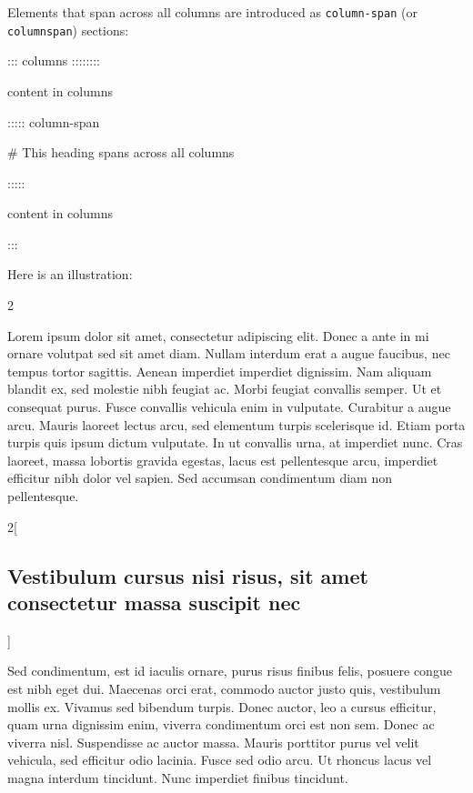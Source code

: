 \documentclass[
]{article}
\newenvironment{Shaded}{}{}
\newcommand{\NormalTok}[1]{#1}
\begin{document}
Elements that span across all columns are introduced as
\texttt{column-span} (or \texttt{columnspan}) sections:

\begin{Shaded}
\begin{Highlighting}[]
\NormalTok{::: columns ::::::::}

\NormalTok{content in columns}

\NormalTok{::::: column{-}span}

\NormalTok{\# This heading spans across all columns}

\NormalTok{:::::}

\NormalTok{content in columns}

\NormalTok{:::}
\end{Highlighting}
\end{Shaded}

Here is an illustration:

{\raggedcolumns\setlength{\columnseprule}{ 1pt}
\renewcommand{\columnseprulecolor}{\color{black}}
\begin{multicols}{2}

Lorem ipsum dolor sit amet, consectetur adipiscing elit. Donec a ante in
mi ornare volutpat sed sit amet diam. Nullam interdum erat a augue
faucibus, nec tempus tortor sagittis. Aenean imperdiet imperdiet
dignissim. Nam aliquam blandit ex, sed molestie nibh feugiat ac. Morbi
feugiat convallis semper. Ut et consequat purus. Fusce convallis
vehicula enim in vulputate. Curabitur a augue arcu. Mauris laoreet
lectus arcu, sed elementum turpis scelerisque id. Etiam porta turpis
quis ipsum dictum vulputate. In ut convallis urna, at imperdiet nunc.
Cras laoreet, massa lobortis gravida egestas, lacus est pellentesque
arcu, imperdiet efficitur nibh dolor vel sapien. Sed accumsan
condimentum diam non pellentesque.

\end{multicols}
\begin{multicols}{2}[\hypertarget{vestibulum-cursus-nisi-risus-sit-amet-consectetur-massa-suscipit-nec}{%
\subsection{Vestibulum cursus nisi risus, sit amet consectetur massa
suscipit
nec}\label{vestibulum-cursus-nisi-risus-sit-amet-consectetur-massa-suscipit-nec}}]

Sed condimentum, est id iaculis ornare, purus risus finibus felis,
posuere congue est nibh eget dui. Maecenas orci erat, commodo auctor
justo quis, vestibulum mollis ex. Vivamus sed bibendum turpis. Donec
auctor, leo a cursus efficitur, quam urna dignissim enim, viverra
condimentum orci est non sem. Donec ac viverra nisl. Suspendisse ac
auctor massa. Mauris porttitor purus vel velit vehicula, sed efficitur
odio lacinia. Fusce sed odio arcu. Ut rhoncus lacus vel magna interdum
tincidunt. Nunc imperdiet finibus tincidunt.

\end{multicols}
}
\end{document}
